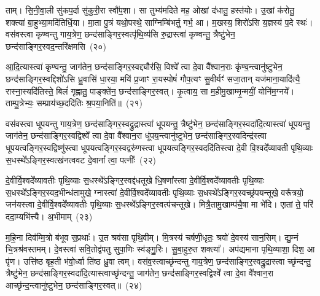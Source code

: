 ताम्। सि॒नी॒वा॒ली सु॑कप॒र्दा सु॑कुरी॒रा स्वौ॑प॒शा। सा तुभ्य॑मदिते मह॒ ओखां द॑धातु॒ हस्त॑योः। उ॒खां क॑रोतु॒ शक्त्या॑ बा॒हुभ्या॒मदि॑तिर्धि॒या। मा॒ता पु॒त्रं यथो॒पस्थे॒ साग्निम्बि॑भर्तु॒ गर्भ॒ आ। म॒खस्य॒ शिरो॑\-ऽसि य॒ज्ञस्य॑ प॒दे स्थः॑। वस॑वस्त्वा कृण्वन्तु गाय॒त्रेण॒ छन्द॑साङ्गिर॒स्वत्पृ॑थि॒व्य॑सि रु॒द्रास्त्वा॑ कृण्वन्तु॒ त्रैष्टु॑भेन॒ छन्द॑साङ्गिर॒स्वद॒न्तरि॑क्षमसि~(२०)

आ॒दि॒त्यास्त्वा॑ कृण्वन्तु॒ जाग॑तेन॒ छन्द॑साङ्गिर॒स्वद्द्यौर॑सि॒ विश्वे᳚ त्वा दे॒वा वै᳚श्वान॒राः कृ॑ण्व॒न्त्वानु॑ष्टुभेन॒ छन्द॑साङ्गिर॒स्वद्दिशो॑\-ऽसि ध्रु॒वासि॑ धा॒रया॒ मयि॑ प्र॒जाꣳ रा॒यस्पोषं॑ गौप॒त्यꣳ सु॒वीर्यꣳ॑ सजा॒तान् यज॑माना॒यादि॑त्यै॒ रास्ना॒स्यदि॑तिस्ते॒ बिलं॑ गृह्णातु॒ पाङ्क्ते॑न॒ छन्द॑साङ्गिर॒स्वत्। कृ॒त्वाय॒ सा म॒हीमु॒खाम्मृ॒न्मयीं॒ योनि॑म॒ग्नये᳚। ताम्पु॒त्रेभ्यः॒ सम्प्राय॑च्छ॒ददि॑तिः श्र॒पया॒निति॑॥~(२१)

{\anuvakamend[{मि॒त्रः क॑रोत्व॒न्तरि॑क्षमसि॒ प्र च॒त्वारि॑ च}]}%

वस॑वस्त्वा धूपयन्तु गाय॒त्रेण॒ छन्द॑साङ्गिर॒स्वद्रु॒द्रास्त्वा॑ धूपयन्तु॒ त्रैष्टु॑भेन॒ छन्द॑साङ्गिर॒स्वदा॑दि॒त्यास्त्वा॑ धूपयन्तु॒ जाग॑तेन॒ छन्द॑साङ्गिर॒स्वद्विश्वे᳚ त्वा दे॒वा वै᳚श्वान॒रा धू॑पय॒न्त्वानु॑ष्टुभेन॒ छन्द॑साङ्गिर॒स्वदिन्द्र॑स्त्वा धूपयत्वङ्गिर॒स्वद्विष्णु॑स्त्वा धूपयत्वङ्गिर॒स्वद्वरु॑णस्त्वा धूपयत्वङ्गिर॒स्वददि॑तिस्त्वा दे॒वी वि॒श्वदे᳚व्यावती पृथि॒व्याः स॒धस्थे᳚\-ऽङ्गिर॒स्वत्ख॑नत्ववट दे॒वानां᳚ त्वा॒ पत्नीः᳚~(२२)

दे॒वीर्वि॒श्वदे᳚व्यावतीः पृथि॒व्याः स॒धस्थे᳚\-ऽङ्गिर॒स्वद्द॑धतूखे धि॒षणा᳚स्त्वा दे॒वीर्वि॒श्वदे᳚व्यावतीः पृथि॒व्याः स॒धस्थे᳚\-ऽङ्गिर॒स्वद॒भीन्ध॑तामुखे॒ ग्नास्त्वा॑ दे॒वीर्वि॒श्वदे᳚व्यावतीः पृथि॒व्याः स॒धस्थे᳚\-ऽङ्गिर॒स्वच्छ्र॑पयन्तूखे॒ वरू᳚त्रयो॒ जन॑यस्त्वा दे॒वीर्वि॒श्वदे᳚व्यावतीः पृथि॒व्याः स॒धस्थे᳚\-ऽङ्गिर॒स्वत्प॑चन्तूखे। मित्रै॒तामु॒खाम्प॑चै॒षा मा भे॑दि। एातां ते॒ परि॑ ददा॒म्यभि॑त्त्यै। अ॒भीमाम्~(२३)

म॒हि॒ना दिव॑म्मि॒त्रो ब॑भूव स॒प्रथाः᳚। उ॒त श्रव॑सा पृथि॒वीम्। मि॒त्रस्य॑ चर्\mbox{}षणी॒धृतः॒ श्रवो॑ दे॒वस्य॑ सान॒सिम्। द्यु॒म्नं चि॒त्रश्र॑वस्तमम्। दे॒वस्त्वा॑ सवि॒तोद्व॑पतु सुपा॒णिः स्व॑ङ्गु॒॒रिः। सु॒बा॒हुरु॒त शक्त्या᳚। अप॑द्यमाना पृथि॒व्याशा॒ दिश॒ आ पृ॑ण। उत्ति॑ष्ठ बृह॒ती भ॑वो॒र्ध्वा ति॑ष्ठ ध्रु॒वा त्वम्। वस॑व॒स्त्वाच्छृ॑न्दन्तु गाय॒त्रेण॒ छन्द॑साङ्गिर॒स्वद्रु॒द्रास्त्वा च्छृ॑न्दन्तु॒ त्रैष्टु॑भेन॒ छन्द॑साङ्गिर॒स्वदा॑दि॒त्यास्त्वाच्छृ॑न्दन्तु॒ जाग॑तेन॒ छन्द॑साङ्गिर॒स्वद्विश्वे᳚ त्वा दे॒वा वै᳚श्वान॒रा आच्छृ॑न्द॒न्त्वानु॑ष्टुभेन॒ छन्द॑साङ्गिर॒स्वत्॥~(२४)

{\anuvakamend[{पत्नी॑रि॒माꣳ रु॒द्रास्त्वाच्छृ॑न्द॒न्त्वेका॒न्नविꣳ॑श॒तिश्च॑}]}%

